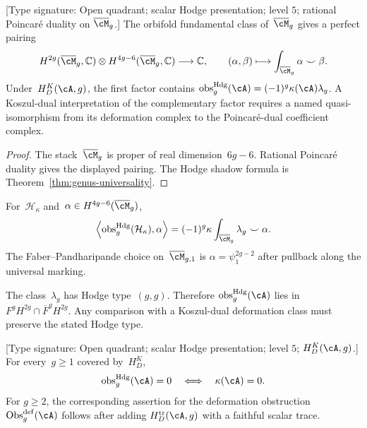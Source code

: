 \begin{theorem}
\label{thm:obs-def-pairing-explicit}
\textup{[Type signature: Open quadrant; scalar Hodge presentation;
level $5$; rational Poincar\'e duality on $\overline{\cM}_g$.]}
The orbifold fundamental class of~$\overline{\cM}_g$ gives a perfect
pairing
\[
 H^{2g}(\overline{\cM}_g,\mathbb C)
 \otimes H^{4g-6}(\overline{\cM}_g,\mathbb C)
 \longrightarrow\mathbb C,
 \qquad
 (\alpha,\beta)\longmapsto
 \int_{\overline{\cM}_g}\alpha\smile\beta.
\]
Under~$H_D^K(\cA,g)$, the first factor contains
$\operatorname{obs}^{\mathrm{Hdg}}_g(\cA)
=(-1)^g\kappa(\cA)\lambda_g$.
A Koszul-dual interpretation of the complementary factor requires a
named quasi-isomorphism from its deformation complex to the
Poincar\'e-dual coefficient complex.
\end{theorem}

\begin{proof}
The stack~$\overline{\cM}_g$ is proper of real dimension~$6g-6$.
Rational Poincar\'e duality gives the displayed pairing.  The Hodge
shadow formula is Theorem~\ref{thm:genus-universality}.
\end{proof}

\begin{example}
\label{ex:heisenberg-pairing}
For~$\mathcal H_\kappa$ and~$\alpha\in
H^{4g-6}(\overline{\cM}_g)$,
\[
 \left\langle
 \operatorname{obs}^{\mathrm{Hdg}}_g(\mathcal H_\kappa),\alpha
 \right\rangle
 =(-1)^g\kappa
 \int_{\overline{\cM}_g}\lambda_g\smile\alpha.
\]
The Faber--Pandharipande choice on~$\overline{\cM}_{g,1}$ is
$\alpha=\psi_1^{2g-2}$ after pullback along the universal marking.
\end{example}

\begin{remark}
\label{rem:hodge-filtration}
The class~$\lambda_g$ has Hodge type~$(g,g)$.  Therefore
$\operatorname{obs}^{\mathrm{Hdg}}_g(\cA)$ lies in
$F^gH^{2g}\cap\overline F^{g}H^{2g}$.  Any comparison with a
Koszul-dual deformation class must preserve the stated Hodge type.
\end{remark}

\begin{proposition}
\label{prop:obstruction-lifting}
\textup{[Type signature: Open quadrant; scalar Hodge presentation;
level $5$; $H_D^K(\cA,g)$.]}
For every~$g\ge1$ covered by~$H_D^K$,
\[
 \operatorname{obs}^{\mathrm{Hdg}}_g(\cA)=0
 \quad\Longleftrightarrow\quad
 \kappa(\cA)=0.
\]
For $g\geq2$, the corresponding assertion for the deformation
obstruction
$\operatorname{Obs}^{\mathrm{def}}_g(\cA)$ follows after adding
$H_D^{\mathrm{tr}}(\cA,g)$ with a faithful scalar trace.
\end{proposition}

